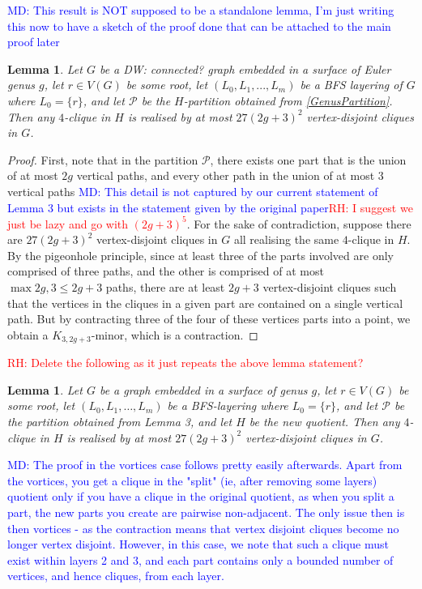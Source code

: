 \documentclass[12pt]{article}
\renewcommand{\leq}{\leqslant}
\newcommand{\scr}[1]{\mathcal{#1}}
\newcommand{\david}[1]{{\color{blue} DW: #1}}
\newcommand{\robert}[1]{\textcolor{red}{RH: #1}}
\newcommand{\marc}[1]{\textcolor{blue}{MD: #1}}
\theoremstyle{plain}
\newtheorem{lem}[thm]{Lemma}
\theoremstyle{definition}
\begin{document}
\marc{This result is NOT supposed to be a standalone lemma, I'm just writing this now to have a sketch of the proof done that can be attached to the main proof later}
\begin{lem}
    Let $G$ be a \david{connected?} graph embedded in a surface of Euler genus $g$, let $r\in V(G)$ be some root, let $(L_0,L_1,...,L_m)$ be a BFS layering of $G$ where $L_0=\{r\}$, and let $\scr{P}$ be the $H$-partition obtained from \cref{GenusPartition}. Then any $4$-clique in $H$ is realised by at most $27(2g+3)^2$ vertex-disjoint cliques in $G$.
\end{lem}
\begin{proof}
    First, note that in the partition $\scr{P}$, there exists one part that is the union of at most $2g$ vertical paths, and every other path in the union of at most 3 vertical paths \marc{This detail is not captured by our current statement of Lemma 3 but exists in the statement given by the original paper}\robert{I suggest we just be lazy and go with $(2g+3)^5$}. For the sake of contradiction, suppose there are $27(2g+3)^2$ vertex-disjoint cliques in $G$ all realising the same $4$-clique in $H$. By the pigeonhole principle, since at least three of the parts involved are only comprised of three paths, and the other is comprised of at most $\max{2g,3}\leq 2g+3$ paths, there are at least $2g+3$ vertex-disjoint cliques such that the vertices in the cliques in a given part are contained on a single vertical path. But by contracting three of the four of these vertices parts into a point, we obtain a $K_{3,2g+3}$-minor, which is a contraction.
\end{proof}
\robert{Delete the following as it just repeats the above lemma statement?}
\begin{lem}
    Let $G$ be a graph embedded in a surface of genus $g$, let $r\in V(G)$ be some root, let $(L_0,L_1,\dots,L_m)$ be a BFS-layering where $L_0=\{r\}$, and let $\scr{P}$ be the partition obtained from Lemma 3, and let $H$ be the new quotient. Then any $4$-clique in $H$ is realised by at most $27(2g+3)^2$ vertex-disjoint cliques in $G$.
\end{lem}

\marc{The proof in the vortices case follows pretty easily afterwards. Apart from the vortices, you get a clique in the "split" (ie, after removing some layers) quotient only if you have a clique in the original quotient, as when you split a part, the new parts you create are pairwise non-adjacent. The only issue then is then vortices - as the contraction means that vertex disjoint cliques become no longer vertex disjoint. However, in this case, we note that such a clique must exist within layers 2 and 3, and each part contains only a bounded number of vertices, and hence cliques, from each layer.}
\end{document}
